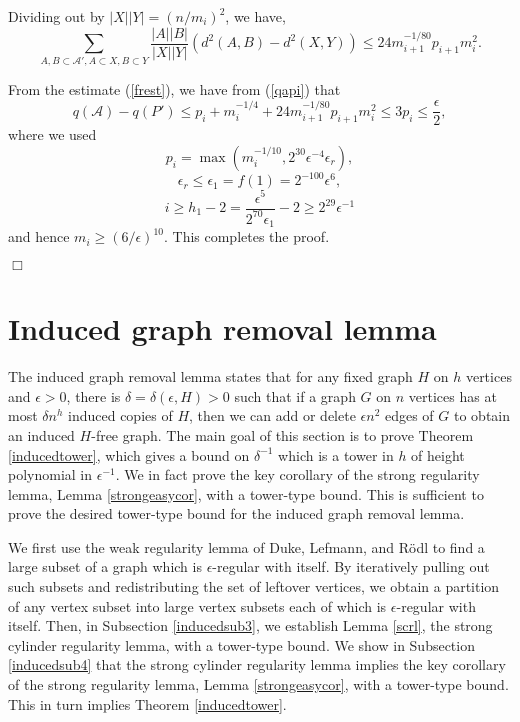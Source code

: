 \documentclass[11pt]{article}
\newenvironment{proof}
      {\medskip\noindent{\bf Proof:}\hspace{1mm}}
      {\hfill$\Box$\medskip}
\begin{document}
\begin{proof}
Dividing out by $|X||Y|=(n/m_i)^2$, we have,
\begin{equation}\label{frest}\sum_{A,B \subset \mathcal{A}', A \subset X, B
\subset Y} \frac{|A||B|}{|X||Y|}\left(d^2(A,B)-d^2(X,Y)\right) \leq
24m_{i+1}^{-1/80}p_{i+1}m_i^2.
 \end{equation}

From the estimate (\ref{frest}), we have from (\ref{qapi}) that
\begin{equation} q(\mathcal{A})-q(P')\leq
p_i+m_i^{-1/4}+24m_{i+1}^{-1/80}p_{i+1}m_i^2 \leq 3p_i \leq
\frac{\epsilon}{2},
\end{equation}
where we used $$p_i=\max(m_i^{-1/10},2^{30}\epsilon^{-4}\epsilon_r),$$
$$\epsilon_r \leq \epsilon_1= f(1)=2^{-100}\epsilon^6,$$ $$i \geq h_1-2 =
\frac{\epsilon^5}{2^{70}\epsilon_1}-2 \geq 2^{29}\epsilon^{-1}$$ and hence $m_i
\geq (6/\epsilon)^{10}$. This completes the proof.

\end{proof}




\section{Induced graph removal lemma} \label{indremovalsection}


The induced graph removal lemma states that for any fixed graph $H$ on $h$
vertices and $\epsilon>0$, there is $\delta=\delta(\epsilon,H)>0$ such that if
a graph $G$ on $n$ vertices has at most $\delta n^h$ induced copies of $H$,
then we can add or delete $\epsilon n^2$ edges of $G$ to obtain an induced
$H$-free graph. The main goal of this section is to prove Theorem
\ref{inducedtower}, which gives a bound on $\delta^{-1}$ which is a tower in $h$ of height polynomial in $\epsilon^{-1}$. We in fact prove the key corollary of the strong regularity lemma, Lemma \ref{strongeasycor}, with a tower-type bound.
This is sufficient to prove the desired tower-type bound for the induced graph removal lemma.

We first use the weak regularity lemma of Duke, Lefmann, and R\"odl to find a
large subset of a graph which is $\epsilon$-regular with itself.  By
iteratively pulling out such subsets and redistributing the set of leftover
vertices, we obtain a partition of any vertex subset into large vertex subsets
each of which is $\epsilon$-regular with itself. Then, in Subsection
\ref{inducedsub3}, we establish Lemma \ref{scrl}, the strong cylinder
regularity lemma, with a tower-type bound. We show in Subsection
\ref{inducedsub4} that the strong cylinder regularity lemma implies the key
corollary of the strong regularity lemma, Lemma \ref{strongeasycor}, with a
tower-type bound. This in turn implies Theorem \ref{inducedtower}.
\end{document}
